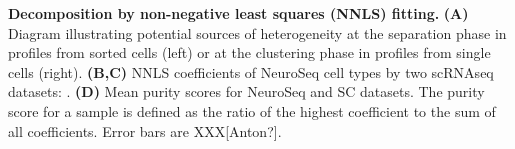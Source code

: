 \textbf{Decomposition by non-negative least squares (NNLS) fitting.}
\textbf{(A)} Diagram illustrating potential sources of heterogeneity at the separation phase in profiles from sorted cells (left) or at the clustering phase in profiles from single cells (right).
\textbf{(B,C)} NNLS coefficients of NeuroSeq cell types by two scRNAseq datasets: \citep{Tasic_2018,Zeisel_2018}.
\textbf{(D)} Mean purity scores for NeuroSeq and SC datasets. The purity score for a sample is defined as the ratio of the highest coefficient to the sum of all coefficients. Error bars are XXX[Anton?].